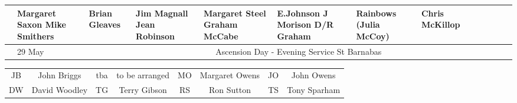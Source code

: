 \documentclass[10pt,a4paper]{article}
\begin{document}
\begin{center}
{\begin{tabular}{|l|p{1.6cm}|p{1.4cm}|p{1.0cm}|p{0.8cm}|p{3.0cm}|p{2cm}|p{1.5cm}|p{2cm}|p{2cm}|p{1.9cm}
|p{2cm}|p{1.6cm}|}
    &  Margaret Saxon \linebreak Mike Smithers & 
Brian Gleaves &  Jim Magnall \linebreak Jean Robinson & 
Margaret Steel \linebreak Graham McCabe &
E.Johnson   \linebreak J Morison  D/R Graham
&  Rainbows \linebreak (Julia McCoy) &   Chris \linebreak McKillop\\
\hline
& 29 May  & \multicolumn{11}{|c|}{\rule[-1mm]{0mm}{6mm}
  Ascension Day - Evening Service St Barnabas}
    \\ 
\hline
\end{tabular}
}

\vspace{1em}
\begin{tabular}{|c|c|c|c|c|c|c|c|}\hline
JB & John Briggs &  tba & to be arranged  & %
 MO & Margaret Owens & JO & John Owens\\
 DW  & David Woodley & TG & Terry Gibson &%
 RS & Ron Sutton & TS & Tony Sparham  \\
   \hline
\end{tabular}
\end{center}
\end{document}
